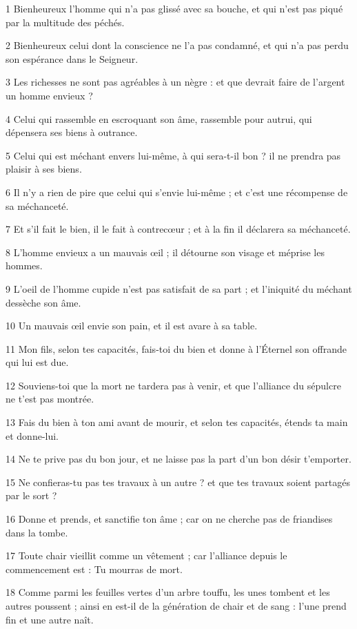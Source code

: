 \par 1 Bienheureux l'homme qui n'a pas glissé avec sa bouche, et qui n'est pas piqué par la multitude des péchés.
\par 2 Bienheureux celui dont la conscience ne l'a pas condamné, et qui n'a pas perdu son espérance dans le Seigneur.
\par 3 Les richesses ne sont pas agréables à un nègre : et que devrait faire de l'argent un homme envieux ?
\par 4 Celui qui rassemble en escroquant son âme, rassemble pour autrui, qui dépensera ses biens à outrance.
\par 5 Celui qui est méchant envers lui-même, à qui sera-t-il bon ? il ne prendra pas plaisir à ses biens.
\par 6 Il n'y a rien de pire que celui qui s'envie lui-même ; et c'est une récompense de sa méchanceté.
\par 7 Et s'il fait le bien, il le fait à contrecœur ; et à la fin il déclarera sa méchanceté.
\par 8 L'homme envieux a un mauvais œil ; il détourne son visage et méprise les hommes.
\par 9 L'oeil de l'homme cupide n'est pas satisfait de sa part ; et l'iniquité du méchant dessèche son âme.
\par 10 Un mauvais œil envie son pain, et il est avare à sa table.
\par 11 Mon fils, selon tes capacités, fais-toi du bien et donne à l'Éternel son offrande qui lui est due.
\par 12 Souviens-toi que la mort ne tardera pas à venir, et que l'alliance du sépulcre ne t'est pas montrée.
\par 13 Fais du bien à ton ami avant de mourir, et selon tes capacités, étends ta main et donne-lui.
\par 14 Ne te prive pas du bon jour, et ne laisse pas la part d'un bon désir t'emporter.
\par 15 Ne confieras-tu pas tes travaux à un autre ? et que tes travaux soient partagés par le sort ?
\par 16 Donne et prends, et sanctifie ton âme ; car on ne cherche pas de friandises dans la tombe.
\par 17 Toute chair vieillit comme un vêtement ; car l'alliance depuis le commencement est : Tu mourras de mort.
\par 18 Comme parmi les feuilles vertes d'un arbre touffu, les unes tombent et les autres poussent ; ainsi en est-il de la génération de chair et de sang : l’une prend fin et une autre naît.
